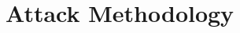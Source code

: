 \documentclass[letterpaper]{article} %
\begin{document}







\section{Attack Methodology}
\end{document}
